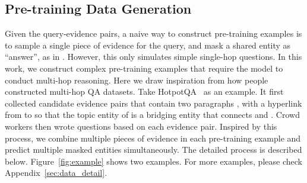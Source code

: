 \documentclass[11pt]{article}
\newcommand{\revise}[1]{#1}
\newcommand{\nop}[1]{}
\begin{document}
\begin{table}[t]
    \centering
    \vspace{-0.5em}
    \caption{\revise{Analysis of pre-training data quality with 50 examples for each setting. \textit{One different} is when  the relation between the selected entities is different from the relation expressed in the query sentence for of the two pieces of evidence.}}\vspace{-1.25em}
    \label{tab:pretrain_data_quality}
\end{table} \subsection{Pre-training Data Generation}
\label{sec:data_generation}
Given the query-evidence pairs, a naive way to construct pre-training examples is to sample a single piece of evidence for the query, and mask a shared entity as ``answer'', as in \citet{glass-etal-2020-span}. However, this only simulates simple single-hop questions. In this work, we construct complex pre-training examples that require the model to conduct multi-hop reasoning\nop{ to encourage the model to do deep reasoning}. Here we draw inspiration from how people constructed multi-hop QA datasets. Take HotpotQA~\cite{yang-etal-2018-hotpotqa} as an example. It first collected candidate evidence pairs that contain two paragraphs , with a hyperlink from  to  so that the topic entity of  is a bridging entity that connects  and . Crowd workers then wrote questions based on each evidence pair. Inspired by this process, we combine multiple pieces of evidence in each pre-training example and predict multiple masked entities simultaneously. The detailed process is described below. Figure~\ref{fig:example} shows two examples. For more examples, please check Appendix~\ref{sec:data_detail}.
\end{document}
